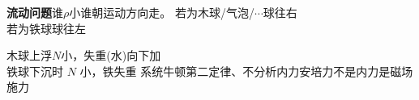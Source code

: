\textbf{流动问题}\quad 谁$\rho$小谁朝运动方向走。
\noindent 若为木球/气泡/$\cdots$\quad 球往右 \\
若为铁球\quad 球往左

\noindent 木球上浮\quad $N$小，失重(水)向下加
\\
铁球下沉时 $N$ 小，铁失重
\noindent 系统牛顿第二定律、不分析内力\quad 安培力\quad 不是内力是磁场施力

